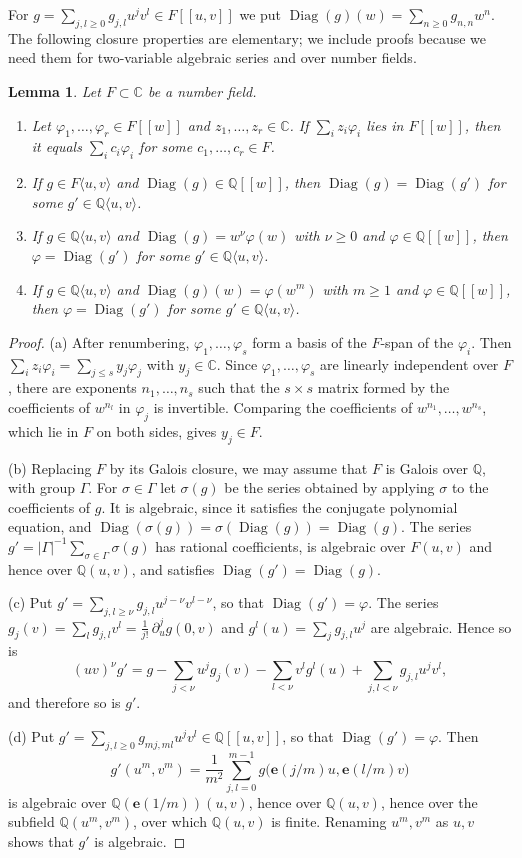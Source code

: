 \documentclass[11pt]{amsart}
\newtheorem{lemma}[theorem]{Lemma}
\theoremstyle{definition}
\theoremstyle{remark}
\numberwithin{equation}{section}
\newcommand{\Q}{\mathbb{Q}}
\newcommand{\C}{\mathbb{C}}
\newcommand{\e}{\mathbf{e}}
\newcommand{\alg}[2]{#1\langle #2\rangle}
\DeclareMathOperator{\Diag}{Diag}
\begin{document}
For $g=\sum_{j,l\ge0}g_{j,l}u^jv^l\in F[[u,v]]$ we put $\Diag(g)(w)=\sum_{n\ge0}g_{n,n}w^n$. The following closure properties are elementary; we include proofs because we need them for two-variable algebraic series and over number fields.

\begin{lemma}\label{lem:closure}
Let $F\subset\C$ be a number field.
\begin{enumerate}[label=\textup{(\alph*)},leftmargin=2em]
\item Let $\varphi_1,\dots,\varphi_r\in F[[w]]$ and $z_1,\dots,z_r\in\C$. If $\sum_iz_i\varphi_i$ lies in $F[[w]]$, then it equals $\sum_ic_i\varphi_i$ for some $c_1,\dots,c_r\in F$.
\item If $g\in\alg F{u,v}$ and $\Diag(g)\in\Q[[w]]$, then $\Diag(g)=\Diag(g')$ for some $g'\in\alg\Q{u,v}$.
\item If $g\in\alg\Q{u,v}$ and $\Diag(g)=w^\nu\varphi(w)$ with $\nu\ge0$ and $\varphi\in\Q[[w]]$, then $\varphi=\Diag(g')$ for some $g'\in\alg\Q{u,v}$.
\item If $g\in\alg\Q{u,v}$ and $\Diag(g)(w)=\varphi(w^m)$ with $m\ge1$ and $\varphi\in\Q[[w]]$, then $\varphi=\Diag(g')$ for some $g'\in\alg\Q{u,v}$.
\end{enumerate}
\end{lemma}

\begin{proof}
(a) After renumbering, $\varphi_1,\dots,\varphi_s$ form a basis of the $F$-span of the $\varphi_i$. Then $\sum_iz_i\varphi_i=\sum_{j\le s}y_j\varphi_j$ with $y_j\in\C$. Since $\varphi_1,\dots,\varphi_s$ are linearly independent over $F$, there are exponents $n_1,\dots,n_s$ such that the $s\times s$ matrix formed by the coefficients of $w^{n_l}$ in $\varphi_j$ is invertible. Comparing the coefficients of $w^{n_1},\dots,w^{n_s}$, which lie in $F$ on both sides, gives $y_j\in F$.

(b) Replacing $F$ by its Galois closure, we may assume that $F$ is Galois over $\Q$, with group $\Gamma$. For $\sigma\in\Gamma$ let $\sigma(g)$ be the series obtained by applying $\sigma$ to the coefficients of $g$. It is algebraic, since it satisfies the conjugate polynomial equation, and $\Diag(\sigma(g))=\sigma(\Diag(g))=\Diag(g)$. The series $g'=|\Gamma|^{-1}\sum_{\sigma\in\Gamma}\sigma(g)$ has rational coefficients, is algebraic over $F(u,v)$ and hence over $\Q(u,v)$, and satisfies $\Diag(g')=\Diag(g)$.

(c) Put $g'=\sum_{j,l\ge\nu}g_{j,l}u^{j-\nu}v^{l-\nu}$, so that $\Diag(g')=\varphi$. The series $g_j(v)=\sum_lg_{j,l}v^l=\frac1{j!}\,\partial_u^jg(0,v)$ and $g^l(u)=\sum_jg_{j,l}u^j$ are algebraic. Hence so is
\[
(uv)^\nu g'=g-\sum_{j<\nu}u^jg_j(v)-\sum_{l<\nu}v^lg^l(u)+\sum_{j,l<\nu}g_{j,l}u^jv^l ,
\]
and therefore so is $g'$.

(d) Put $g'=\sum_{j,l\ge0}g_{mj,ml}u^jv^l\in\Q[[u,v]]$, so that $\Diag(g')=\varphi$. Then
\[
g'(u^m,v^m)=\frac1{m^2}\sum_{j,l=0}^{m-1}g\big(\e(j/m)u,\e(l/m)v\big)
\]
is algebraic over $\Q(\e(1/m))(u,v)$, hence over $\Q(u,v)$, hence over the subfield $\Q(u^m,v^m)$, over which $\Q(u,v)$ is finite. Renaming $u^m,v^m$ as $u,v$ shows that $g'$ is algebraic.
\end{proof}
\end{document}
